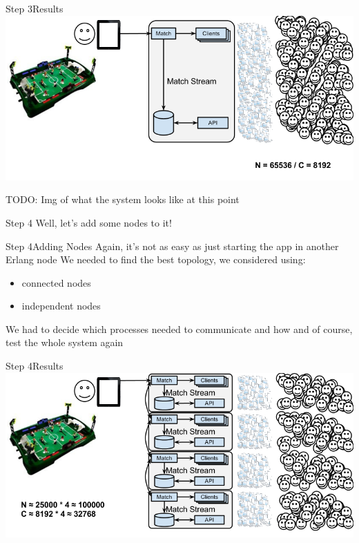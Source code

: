 \documentclass[utf8]{beamer}
\begin{document}
\begin{frame}{Step 3}{Results}
	\includegraphics[top=-1,width=\textwidth]{img/MatchStream-3.png}
\end{frame}

\begin{frame}
TODO: Img of what the system looks like at this point
\end{frame}

\begin{frame}{Step 4}
Well, let's add some nodes to it!
\end{frame}

\begin{frame}{Step 4}{Adding Nodes}
Again, it's not as easy as just starting the app in another Erlang node
\pause
We needed to find the best topology, we considered using:
	\begin{itemize}
		\item connected nodes
		\item independent nodes
	\end{itemize}
\pause
We had to decide which processes needed to communicate and how
\pause
and of course, test the whole system again
\end{frame}

\begin{frame}{Step 4}{Results}
	\includegraphics[top=-1,width=\textwidth]{img/MatchStream-4.png}
\end{frame}
\end{document}
